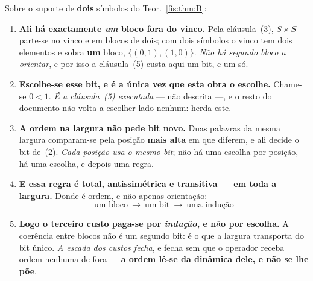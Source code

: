 \documentclass[livro.tex]{subfiles}
\begin{document}
\begin{teorema}\label{fis:thm:ordem}
Sobre o suporte de \textbf{dois} símbolos do Teor.~\ref{fis:thm:B}:
\begin{enumerate}\itemsep3pt
\item[(1)] \textbf{Ali há exactamente \emph{um} bloco fora do vinco.} Pela
cláusula~(3), $S\times S$ parte-se no vinco e em blocos de dois; com dois
símbolos o vinco tem dois elementos e sobra \textbf{um} bloco,
$\{(0,1),(1,0)\}$. \emph{Não há segundo bloco a orientar}, e por isso a
cláusula~(5) custa aqui um bit, e um só.
\item[(2)] \textbf{Escolhe-se esse bit, e é a única vez que esta obra o escolhe.}
Chame-se $0<1$. \emph{É a cláusula~(5) executada} --- não descrita ---, e o
resto do documento não volta a escolher lado nenhum: herda este.
\item[(3)] \textbf{A ordem na largura não pede bit novo.} Duas palavras da mesma
largura comparam-se pela posição \textbf{mais alta} em que diferem, e ali decide
o bit de~(2). \emph{Cada posição usa o mesmo bit}; não há uma escolha por
posição, há uma escolha, e depois uma regra.
\item[(4)] \textbf{E essa regra é total, antissimétrica e transitiva --- em toda
a largura.} Donde é ordem, e não apenas orientação:
\[
\boxed{\;\text{um bloco}\ \to\ \text{um bit}\ \to\ \text{uma indução}\;}
\]
\item[(5)] \textbf{Logo o terceiro custo paga-se por \emph{indução}, e não por
escolha.} A coerência entre blocos não é um segundo bit: é o que a largura
transporta do bit único. \emph{A escada dos custos fecha}, e fecha sem que o
operador receba ordem nenhuma de fora --- \textbf{a ordem lê-se da dinâmica dele,
e não se lhe põe}.
\end{enumerate}
\end{teorema}
\end{document}
